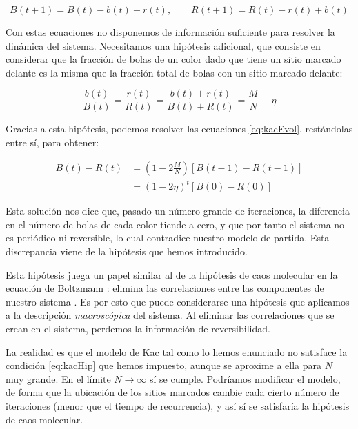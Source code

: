 \documentclass[11pt, a4paper]{article} %
\theoremstyle{named}
\begin{document}
\begin{equation}\label{eq:kacEvol}
B(t+1) = B(t) - b(t) + r(t), \qquad
R(t+1) = R(t) - r(t) + b(t)
\end{equation}

Con estas ecuaciones no disponemos de información suficiente para resolver la dinámica del sistema. Necesitamos una hipótesis adicional, que consiste en considerar que la fracción de bolas de un color dado que tiene un sitio marcado delante es la misma que la fracción total de bolas con un sitio marcado delante:

\begin{equation}\label{eq:kacHip}
\frac{b(t)}{B(t)} = \frac{r(t)}{R(t)} = \frac{b(t) + r(t)}{B(t) + R(t)} = \frac{M}{N} \equiv \eta
\end{equation}

Gracias a esta hipótesis, podemos resolver las ecuaciones \eqref{eq:kacEvol}, restándolas entre sí, para obtener:

\begin{equation}
\begin{aligned}
B(t)-R(t) &=\left(1-2 \frac{M}{N}\right)\left[B(t-1)-R(t-1)\right] \nonumber \\
&=\left(1-2 \eta\right)^{t}\left[B(0)-R(0)\right]
\end{aligned}
\end{equation}

Esta solución nos dice que, pasado un número grande de iteraciones, la diferencia en el número de bolas de cada color tiende a cero, y que por tanto el sistema no es periódico ni reversible, lo cual contradice nuestro modelo de partida. Esta discrepancia viene de la hipótesis que hemos introducido.

Esta hipótesis juega un papel similar al de la hipótesis de caos molecular en la ecuación de Boltzmann \cite{haro}: elimina las correlaciones entre las componentes de nuestro sistema \cite{gottwald}. Es por esto que puede considerarse una hipótesis que aplicamos a la descripción \textit{macroscópica} del sistema. Al eliminar las correlaciones que se crean en el sistema, perdemos la información de reversibilidad.

La realidad es que el modelo de Kac tal como lo hemos enunciado no satisface la condición \eqref{eq:kacHip} que hemos impuesto, aunque se aproxime a ella para $N$ muy grande. En el límite $N \rightarrow \infty$ sí se cumple. Podríamos modificar el modelo, de forma que la ubicación de los sitios marcados cambie cada cierto número de iteraciones (menor que el tiempo de recurrencia), y así sí se satisfaría la hipótesis de caos molecular.
\end{document}

